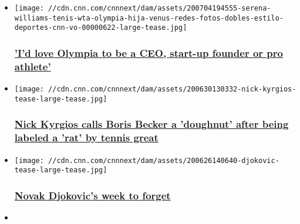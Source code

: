 \begin{itemize}
\item
  \href{/2020/08/04/tennis/alexis-ohanian-serena-williams-olympia-spt-intl/index.html}{}

  \texttt{[image: //cdn.cnn.com/cnnnext/dam/assets/200704194555-serena-williams-tenis-wta-olympia-hija-venus-redes-fotos-dobles-estilo-deportes-cnn-vo-00000622-large-tease.jpg]}

  \hypertarget{id-love-olympia-to-be-a-ceo-start-up-founder-or-pro-athlete}{%
  \subsubsection{\texorpdfstring{\href{/2020/08/04/tennis/alexis-ohanian-serena-williams-olympia-spt-intl/index.html}{'I'd
  love Olympia to be a CEO, start-up founder or pro
  athlete'}}{'I'd love Olympia to be a CEO, start-up founder or pro athlete'}}\label{id-love-olympia-to-be-a-ceo-start-up-founder-or-pro-athlete}}
\item
  \href{/2020/06/30/tennis/nick-kyrgios-boris-becker-alexander-zverev-tennis-coronavirus-party-spt-intl/index.html}{}

  \texttt{[image: //cdn.cnn.com/cnnnext/dam/assets/200630130332-nick-kyrgios-tease-large-tease.jpg]}

  \hypertarget{nick-kyrgios-calls-boris-becker-a-doughnut-after-being-labeled-a-rat-by-tennis-great}{%
  \subsubsection{\texorpdfstring{\href{/2020/06/30/tennis/nick-kyrgios-boris-becker-alexander-zverev-tennis-coronavirus-party-spt-intl/index.html}{Nick
  Kyrgios calls Boris Becker a 'doughnut' after being labeled a 'rat' by
  tennis
  great}}{Nick Kyrgios calls Boris Becker a 'doughnut' after being labeled a 'rat' by tennis great}}\label{nick-kyrgios-calls-boris-becker-a-doughnut-after-being-labeled-a-rat-by-tennis-great}}
\item
  \href{/2020/06/27/tennis/novak-djokovic-adria-tour-backlash-spt-intl/index.html}{}

  \texttt{[image: //cdn.cnn.com/cnnnext/dam/assets/200626140640-djokovic-tease-large-tease.jpg]}

  \hypertarget{novak-djokovics-week-to-forget}{%
  \subsubsection{\texorpdfstring{\href{/2020/06/27/tennis/novak-djokovic-adria-tour-backlash-spt-intl/index.html}{Novak
  Djokovic's week to
  forget}}{Novak Djokovic's week to forget}}\label{novak-djokovics-week-to-forget}}
\item
  \href{/2020/06/22/tennis/amanda-anisimova-maria-sharapova-2-0-spt-intl/index.html}{}


\end{itemize}
